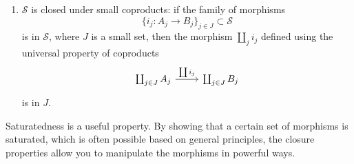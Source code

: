 \documentclass[main.tex]{subfiles}
\begin{document}
\begin{definition}[saturated]
\begin{enumerate}
    \item $\mathcal{S}$ is closed under small coproducts: if the family of morphisms
      \begin{equation*}
        \{i_{j}\colon A_{j} \to B_{j}\}_{j \in J} \subset \mathcal{S}
      \end{equation*}
      is in $\mathcal{S}$, where $J$ is a small set, then the morphism $\coprod_{j} i_{j}$ defined using the universal property of coproducts
      \begin{equation*}
        \begin{tikzcd}
          \coprod_{j \in J} A_{j}
          \arrow[r, "\coprod i_{j}"]
          & \coprod_{j \in J} B_{j}
        \end{tikzcd}
      \end{equation*}
      is in $J$.
  \end{enumerate}
\end{definition}

Saturatedness is a useful property. By showing that a certain set of morphisms is saturated, which is often possible based on general principles, the closure properties allow you to manipulate the morphisms in powerful ways.
\end{document}
